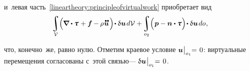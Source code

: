 \begin{otherlanguage}{russian}
\vspace{-0.2em} \noindent и~левая часть~\eqref{lineartheory:principleofvirtualwork} приобретает вид
\[
\integral\displaylimits_{\mathcal{V}} \hspace{-0.5ex} \left(^{\mathstrut} \hspace{-0.2ex} \boldnabla \dotp \mathboldtau \hspace{0.12ex} + \bm{f} \hspace{-0.1ex} - \hspace{-0.1ex} \rho \hspace{0.1ex} \mathdotdotabove{\bm{u}} \hspace{0.25ex} \right) \hspace{-0.32ex} \dotp \variation{\bm{u}} \hspace{0.25ex} d\mathcal{V} + \hspace{-0.2ex}
\integral\displaylimits_{o_2} \hspace{-0.5ex} \left(^{\mathstrut} \bm{p} - \bm{n} \dotp \mathboldtau \right) \hspace{-0.32ex} \dotp \variation{\bm{u}} \hspace{0.25ex} do \hspace{0.1ex},
\]

\vspace{-0.4em} \noindent что, конечно~же, равно нулю. Отметим краевое условие ${\bm{u} \hspace{0.1ex} \bigr|_{o_1} \hspace{-0.64ex} = \hspace{0.2ex} 0}$: виртуальные перемещения согласованы с~этой связью\:--- ${\updelta\hspace{-0.1ex}\bm{u} \hspace{0.1ex} \bigr|_{o_1} \hspace{-0.64ex} = \hspace{0.2ex} 0}$.

\end{otherlanguage}



\label{para:uniquenessfordynamicproblem}

